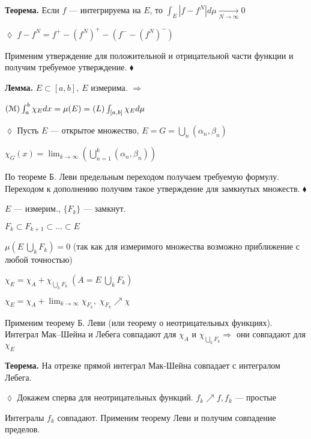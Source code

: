 \textbf{Теорема.} \quad Если $f$ --- интегрируема на $E$, то
$\int_E |f - f^N| d\mu \xrightarrow[N \rightarrow \infty]{} 0$

$\lozenge$ $f - f^N = f^+ - (f^N)^+ - (f^- - (f^N)^-)$

Применим утверждение для положительной и отрицательной части
функции и получим требуемое утверждение. $\blacklozenge$

\textbf{Лемма.} \quad $E \subset [a, b], \: E$ измерима.
$\Rightarrow$

$\EuScript{(M)} \int_a^b \chi_E d x = \mu(E) = (L) \int_{[a,b]}
\chi_E d \mu$

$\lozenge$ Пусть $E$ --- открытое множество, $E = G =
\bigcup_n(\alpha_n, \beta_n)$

$\chi_G(x) = \lim_{k \rightarrow \infty} (\bigcup_{n=1}^k
(\alpha_n, \beta_n))$

По теореме Б. Леви предельным переходом
%
%
%
%
%
%
%
%
%
%
%
%
получаем требуемую формулу. Переходом к дополнению получим такое
утверждение для замкнутых множеств.  $\blacklozenge$

$E$ --- измерим., $\{F_k\}$ --- замкнут.

$F_k \subset F_{k+1} \subset \ldots \subset E$

$\mu (E \ \bigcup_k F_k) = 0$ (так как для измеримого множества
возможно приближение с любой точностью)

$\chi_E = \chi_A + \chi_{\bigcup_k F_k} \; (A = E \ \bigcup_k
F_k)$

$\chi_E = \chi_A + \lim_{k \rightarrow \infty} \chi_{F_k}, \;
\chi_{F_k} \nearrow \chi$

Применим теорему Б. Леви (или теорему о неотрицательных функциях).
Интеграл Мак--Шейна и Лебега совпадают для $\chi_A$ и
$\chi_{\bigcup_k F_k} \Rightarrow$ они совпадают для $\chi_E$


\textbf{Теорема.} \quad На отрезке прямой интеграл Мак-Шейна
совпадает с интегралом Лебега.

$\lozenge$ Докажем сперва для неотрицательных функций. $f_k
\nearrow f, f_k$ --- простые

Интегралы $f_k$ совпадают. Применим теорему Леви и получим
совпадение пределов.

